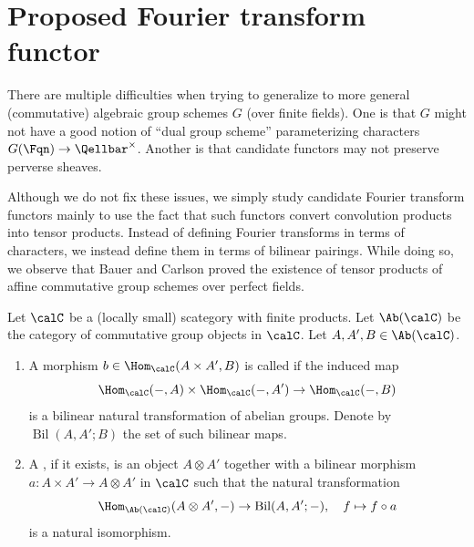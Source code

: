 \section{Proposed Fourier transform functor}

There are multiple difficulties when trying to generalize  to more general (commutative) algebraic group schemes $G$ (over finite fields). One is that $G$ might not have a good notion of ``dual group scheme'' parameterizing characters $G(\Fqn) \to \Qellbar^\times$. Another is that candidate functors may not preserve perverse sheaves. 

Although we do not fix these issues, we simply study candidate Fourier transform functors mainly to use the fact that such functors convert convolution products into tensor products. Instead of defining Fourier transforms in terms of characters, we instead define them in terms of bilinear pairings. While doing so, we observe that Bauer and Carlson \cite{bauer_carlson_tpafag} proved the existence of tensor products of affine commutative group schemes over perfect fields.

\begin{definition} \label{definition:tensor_product_of_group_objects_in_a_category}
    Let $\calC$ be a (locally small) scategory with finite products. Let $\Ab(\calC)$ be the category of commutative group objects in $\calC$. Let $A,A',B \in \Ab(\calC)$.
    \begin{enumerate}
        \item A morphism $b \in \Hom_\calC(A \times A', B)$ is called  if the induced map
        $$\Hom_{\calC}(-, A) \times \Hom_{\calC}(-, A') \to \Hom_{\calC}(-, B)$$
        is a bilinear natural transformation of abelian groups. Denote by $\operatorname{Bil}(A,A';B)$ the set of such bilinear maps.
        \item A , if it exists, is an object $A \otimes A'$ together with a bilinear morphism $a: A \times A' \to A \otimes A'$ in $\calC$ such that the natural transformation
        $$\Hom_{\Ab(\calC)}(A \otimes A', -) \to \operatorname{Bil}(A,A';-), \quad f \mapsto f \circ a$$
        is a natural isomorphism.
    \end{enumerate}
\end{definition}

